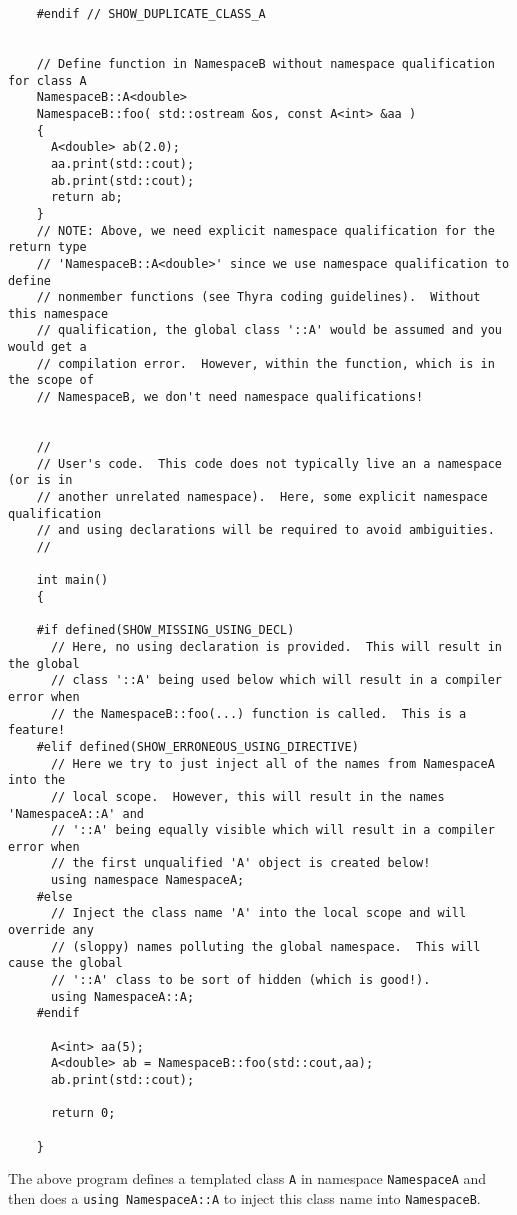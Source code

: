 {\begin{verbatim}
    #endif // SHOW_DUPLICATE_CLASS_A
    
    
    // Define function in NamespaceB without namespace qualification for class A
    NamespaceB::A<double>
    NamespaceB::foo( std::ostream &os, const A<int> &aa )
    {
      A<double> ab(2.0);
      aa.print(std::cout);
      ab.print(std::cout);
      return ab;
    }
    // NOTE: Above, we need explicit namespace qualification for the return type
    // 'NamespaceB::A<double>' since we use namespace qualification to define
    // nonmember functions (see Thyra coding guidelines).  Without this namespace
    // qualification, the global class '::A' would be assumed and you would get a
    // compilation error.  However, within the function, which is in the scope of
    // NamespaceB, we don't need namespace qualifications!
    
    
    //
    // User's code.  This code does not typically live an a namespace (or is in
    // another unrelated namespace).  Here, some explicit namespace qualification
    // and using declarations will be required to avoid ambiguities.
    //
    
    int main()
    {
    
    #if defined(SHOW_MISSING_USING_DECL)
      // Here, no using declaration is provided.  This will result in the global
      // class '::A' being used below which will result in a compiler error when
      // the NamespaceB::foo(...) function is called.  This is a feature!
    #elif defined(SHOW_ERRONEOUS_USING_DIRECTIVE)
      // Here we try to just inject all of the names from NamespaceA into the
      // local scope.  However, this will result in the names 'NamespaceA::A' and
      // '::A' being equally visible which will result in a compiler error when
      // the first unqualified 'A' object is created below!
      using namespace NamespaceA;
    #else
      // Inject the class name 'A' into the local scope and will override any
      // (sloppy) names polluting the global namespace.  This will cause the global
      // '::A' class to be sort of hidden (which is good!).
      using NamespaceA::A;
    #endif
    
      A<int> aa(5);
      A<double> ab = NamespaceB::foo(std::cout,aa);
      ab.print(std::cout);
      
      return 0;
      
    }
\end{verbatim}}

The above program defines a templated class {}\texttt{A} in namespace
{}\texttt{NamespaceA} and then does a {}\texttt{using NamespaceA::A} to inject
this class name into {}\texttt{NamespaceB}.

